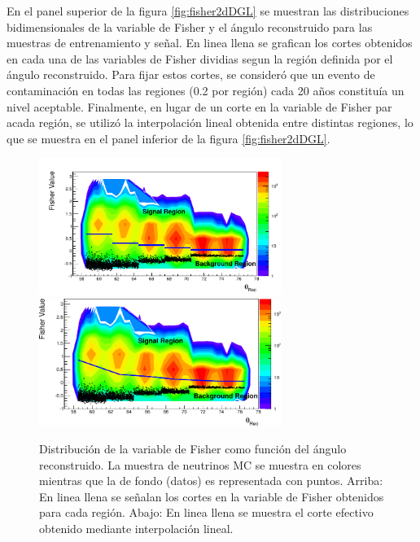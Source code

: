 	En el panel superior de la figura \ref{fig:fisher2dDGL} se muestran las distribuciones bidimensionales de la variable de Fisher y el ángulo reconstruido para las muestras de entrenamiento y señal. En linea llena se grafican los cortes obtenidos en cada una de las variables de Fisher dividias segun la región definida por el ángulo reconstruido.
	Para fijar estos cortes, se consideró que un evento de contaminación en todas las regiones (0.2 por región) cada 20 años constituía un nivel aceptable.
	Finalmente, en lugar de un corte en la variable de Fisher par acada región, se utilizó la interpolación lineal obtenida entre distintas regiones, lo que se muestra en el panel inferior de la figura \ref{fig:fisher2dDGL}.
	\begin{figure}[ht]
	\begin{center}
	\includegraphics[width=0.7\textwidth]{fig/seleccionAuger/fisher2dDGL}\\
	\includegraphics[width=0.7\textwidth]{fig/seleccionAuger/fisher2dInterpolDGL}
	\caption{Distribución de la variable de Fisher como función del ángulo reconstruido. La muestra de neutrinos MC se muestra en colores mientras que la de fondo (datos) es representada con puntos. Arriba: En linea llena se señalan los cortes en la variable de Fisher obtenidos para cada región. Abajo: En linea llena se muestra el corte efectivo obtenido mediante interpolación lineal.}
	\label{fig:fisherDGL}
	\end{center}
	\end{figure}
	

